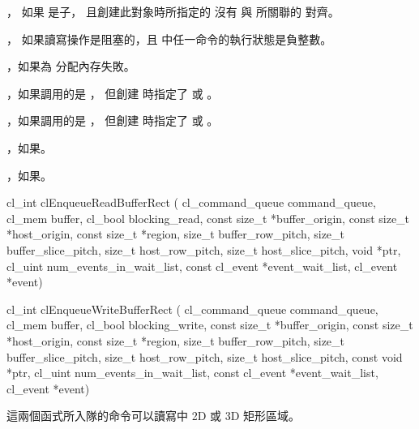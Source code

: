 \item {}，
如果  是子，
且創建此對象時所指定的  沒有
與  所關聯的  對齊。

\item {}，
如果讀寫操作是阻塞的，且  中任一命令的執行狀態是負整數。

\item {}，如果為  分配內存失敗。

\item {}，如果調用的是 ，
但創建  時指定了  或 。

\item {}，如果調用的是 ，
但創建  時指定了  或 。

\item {}，如果\scdevfailres。
\item {}，如果\schostfailres。
\stopigBase



\startCLFUNC
cl_int clEnqueueReadBufferRect (
			cl_command_queue command_queue,
			cl_mem buffer,
			cl_bool blocking_read,
			const size_t *buffer_origin,
			const size_t *host_origin,
			const size_t *region,
			size_t buffer_row_pitch,
			size_t buffer_slice_pitch,
			size_t host_row_pitch,
			size_t host_slice_pitch,
			void *ptr,
			cl_uint num_events_in_wait_list,
			const cl_event *event_wait_list,
			cl_event *event)

cl_int clEnqueueWriteBufferRect (
			cl_command_queue command_queue,
			cl_mem buffer,
			cl_bool blocking_write,
			const size_t *buffer_origin,
			const size_t *host_origin,
			const size_t *region,
			size_t buffer_row_pitch,
			size_t buffer_slice_pitch,
			size_t host_row_pitch,
			size_t host_slice_pitch,
			const void *ptr,
			cl_uint num_events_in_wait_list,
			const cl_event *event_wait_list,
			cl_event *event)
\stopCLFUNC

這兩個函式所入隊的命令可以讀寫中 2D 或 3D 矩形區域。

